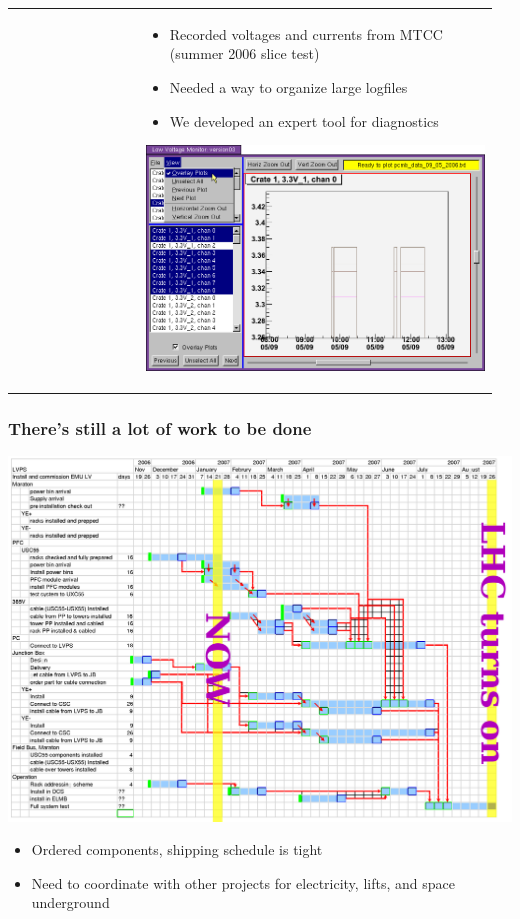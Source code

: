 \documentclass[compress]{beamer}
\begin{document}
\begin{frame}
\begin{tabular}{p{0.26\linewidth} p{0.7\linewidth}}
\begin{minipage}{\linewidth}
  \end{minipage} &
  \hspace{-1 cm}
  \begin{minipage}{1.2\linewidth}
    \begin{itemize}
      \item Recorded voltages and currents from MTCC (summer 2006 slice test)
      \item Needed a way to organize large logfiles
      \item We developed an expert tool for diagnostics
    \end{itemize}
    \begin{center}
      \includegraphics[width=0.67\linewidth]{plots/mine/lowvolt.png}
    \end{center}
  \end{minipage}
\end{tabular}
\end{frame}

\begin{frame}
\frametitle{There's still a lot of work to be done}
\begin{center}
\includegraphics[width=0.6\linewidth]{plots/lowvolt/sashas_schedule.png}
\end{center}

\vspace{-0.5 cm}
\begin{itemize}
  \item Ordered components, shipping schedule is tight
  \item Need to coordinate with other projects for electricity, lifts,
  and space underground
\end{itemize}
\end{frame}
\end{document}
